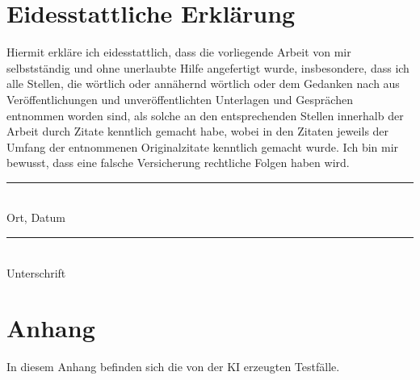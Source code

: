 \documentclass[12pt,toc=bib,toc=listof]{scrreprt}
\begin{document}
\chapter*{Eidesstattliche Erklärung} %
\label{sec:eidesstattlicheErklärung}
Hiermit erkläre ich eidesstattlich, dass die vorliegende Arbeit von mir selbstständig und ohne unerlaubte Hilfe angefertigt wurde, insbesondere, dass ich alle Stellen, die wörtlich oder annähernd wörtlich oder dem Gedanken nach aus Veröffentlichungen und unveröffentlichten Unterlagen und Gesprächen entnommen worden sind, als solche an den entsprechenden Stellen innerhalb der Arbeit durch Zitate kenntlich gemacht habe, wobei in den Zitaten jeweils der Umfang der entnommenen Originalzitate kenntlich gemacht wurde. Ich bin mir bewusst, dass eine falsche Versicherung rechtliche Folgen haben wird.
\newline
\newline
\newline
\newline
\noindent
\begin{minipage}[t]{0.4\textwidth} 
    \centering 
    \rule{\textwidth}{0.4pt} \\ 
    Ort, Datum
\end{minipage}%
\hfill
\begin{minipage}[t]{0.4\textwidth} 
    \centering 
    \rule{\textwidth}{0.4pt} \\ 
    Unterschrift
\end{minipage}

\chapter*{Anhang} %
\label{sec:anhang}
In diesem Anhang befinden sich die von der KI erzeugten Testfälle.

\end{document}
